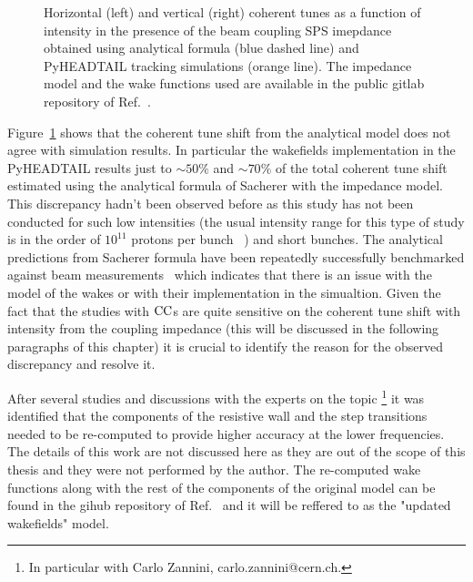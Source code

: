 \begin{figure}[!ht]
\begin{subfigure}[t]{0.45\textwidth}
    \end{subfigure}
    \hfill
     \caption{Horizontal (left) and vertical (right) coherent tunes as a function of intensity in the presence of the beam coupling SPS imepdance obtained using analytical formula (blue dashed line) and PyHEADTAIL tracking simulations (orange line). The impedance model and the wake functions used are available in the public gitlab repository of Ref.~\cite{sps_impedance_model_git}.} %
     \label{fig:sps_coherent_DQ_vs_intensity_original_complete_model}
 \end{figure}

 Figure~\ref{fig:sps_coherent_DQ_vs_intensity_original_complete_model} shows that the coherent tune shift from the analytical model does not agree with simulation results. In particular the wakefields implementation in the PyHEADTAIL results just to $\sim 50 \%$ and $\sim 70 \%$ of the total coherent tune shift estimated using the analytical formula of Sacherer with the impedance model. This discrepancy hadn't been observed before as this study has not been conducted for such low intensities (the usual intensity range for this type of study is in the order of $10^{11}$ protons per bunch ~\cite{Beck:2683038}) and short bunches. %
 The analytical predictions from Sacherer formula have been repeatedly successfully benchmarked against beam measurements~\cite{Bartosik:1742183, sps_impedance_measurements_vs_model} which indicates that there is an issue with the model of the wakes or with their implementation in the simualtion. Given the fact that the studies with ${\mathrm{CC}}$s are quite sensitive on the coherent tune shift with intensity from the coupling impedance (this will be discussed in the following paragraphs of this chapter) it is crucial to identify the reason for the observed discrepancy and resolve it.

 After several studies and discussions with the experts on the topic \footnote{In particular with Carlo Zannini, carlo.zannini@cern.ch.} it was identified that the components of the resistive wall and the step transitions needed to be re-computed to provide higher accuracy at the lower frequencies. The details of this work are not discussed here as they are out of the scope of this thesis and they were not performed by the author. The re-computed wake functions along with the rest of the components of the original model can be found in the gihub repository of Ref.~\cite{updated_sps_wakfields_model} and it will be reffered to as the "updated wakefields" model.

